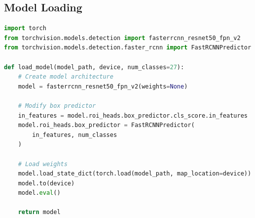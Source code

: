 \documentclass[12pt,a4paper]{article}
\begin{document}
\subsection{Model Loading}

\begin{lstlisting}[language=python, caption=Loading the Trained Model]
import torch
from torchvision.models.detection import fasterrcnn_resnet50_fpn_v2
from torchvision.models.detection.faster_rcnn import FastRCNNPredictor

def load_model(model_path, device, num_classes=27):
    # Create model architecture
    model = fasterrcnn_resnet50_fpn_v2(weights=None)
    
    # Modify box predictor
    in_features = model.roi_heads.box_predictor.cls_score.in_features
    model.roi_heads.box_predictor = FastRCNNPredictor(
        in_features, num_classes
    )
    
    # Load weights
    model.load_state_dict(torch.load(model_path, map_location=device))
    model.to(device)
    model.eval()
    
    return model
\end{lstlisting}

\end{document}
